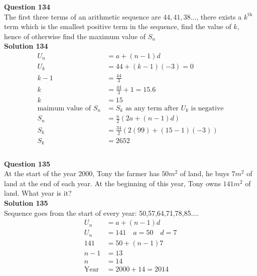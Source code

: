 \documentclass{article}
\begin{document}
\noindent\textbf{Question 134}\\[5pt]
The first three terms of an arithmetic sequence are $44,41,38...$, there exists a $k^{\text{th}}$ term which is the smallest positive term in the sequence, find the value of $k$, hence of otherwise find the maximum value of $S_n$\\[5pt]
\noindent\textbf{Solution 134}\\[5pt]
\begin{align*}
U_n&=a+(n-1)d\\[2pt]
U_k&=44+(k-1)(-3)=0\\[2pt]
k-1&=\displaystyle\frac{44}{3}\\[2pt]
k&=\displaystyle\frac{44}{3}+1=15.6\\[2pt]
k&=15\\[12pt]
\text{maimum value of} \,\,S_n&=S_k\,\, \text{as any term after}\,\, U_k\,\, \text{is negative}\\[2pt]
S_n&=\displaystyle\frac{n}{2}(2a+(n-1)d)\\[2pt]
S_k&=\displaystyle\frac{34}{2}(2(99)+(15-1)(-3))\\[2pt]
S_k&=2652\\[-90pt]
\end{align*}\\[10pt]

\noindent\textbf{Question 135}\\[5pt]
At the start of the year 2000, Tony the farmer has $50m^2$ of land, he buys $7m^2$ of land at the end of each year. At the beginning of this year, Tony owns $141m^2$ of land. What year is it?\\[5pt]
\noindent\textbf{Solution 135}\\[5pt]
Sequence goes from the start of every year: 50,57,64,71,78,85....
\begin{align*}
U_n&=a+(n-1)d\\[2pt]
U_n&=141 \quad a=50 \quad d=7\\[2pt]
141&=50+(n-1)7\\[2pt]
n-1&=13\\[2pt]
n&=14\\[2pt]
\text{Year}&=2000+14=2014\\[-70pt]
\end{align*}\\[10pt]
\end{document}
